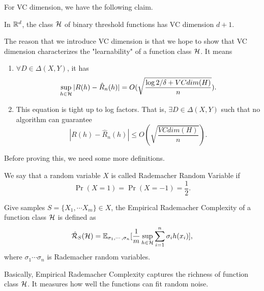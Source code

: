 \documentclass[../main.tex]{subfiles}
\begin{document}
	For VC dimension, we have the following claim.
	
	\begin{claim}
		In $\mathbb{R}^d$, the class $\mathcal{H}$ of binary threshold functions has VC dimension $d+1$.
	\end{claim}

	The reason that we introduce VC dimension is that we hope to show that VC dimension characterizes the "learnability" of a function class $\mathcal{H}$. It means
	
	\begin{enumerate}
		\item $\forall D \in \Delta(X,Y)$, it has
			\begin{equation*}
				\sup\limits_{h\in\mathcal{H}} |R(h) - \hat{R}_n (h)| =  O( \sqrt{\frac{\log 2 / \delta + VCdim(H)}{n}}).
			\end{equation*}
		\item This equation is tight up to log factors. That is, $\exists D\in  \Delta(X,Y)$ such that no algorithm can guarantee
			\begin{equation*}
				|R(h) - \hat{R}_n (h)| \leq O( \sqrt{\frac{ VCdim(H)}{n}}).
			\end{equation*}
	\end{enumerate}

	Before proving this, we need some more definitions.
	
	\begin{definition}
		We say that a random variable $X$ is called Rademacher Random Variable if 
			\begin{equation}
				\Pr(X= 1) = \Pr(X=-1) = \frac{1}{2}.
			\end{equation}
	\end{definition}
	
	\begin{definition}
		Give samples $S = \{X_1,\cdots X_m\} \in X$, the Empirical Rademacher Complexity of a function class $\mathcal{H}$ is defined as
			\begin{equation}
				\hat{\mathcal{R}}_S(\mathcal{H}) = \mathbb{E}_{\sigma_1,\cdots,\sigma_n} [\frac{1}{m} \sup\limits_{h\in \mathcal{H}} \sum\limits_{i=1}^n \sigma_i h(x_i)],
			\end{equation}
		where $\sigma_1\cdots \sigma_n$ is Rademacher random variables.
	\end{definition}

	Basically, Empirical Rademacher Complexity captures the richness of function class $\mathcal{H}$. It measures how well the functions can fit random noise.
	
\end{document}

